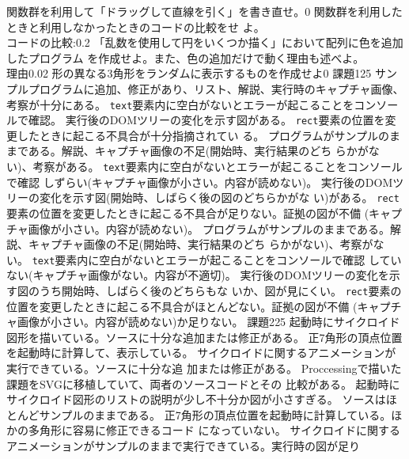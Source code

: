 \documentclass[a4j]{jreport}
\begin{document}
 {
 {\Must 関数群を利用して「ドラッグして直線を引く」を書き直せ。}{0}
 {\Must 関数群を利用したときと利用しなかったときのコードの比較をせ
 よ。\\コードの比較:}{0.2}
 {「乱数を使用して円をいくつか描く」において配列に色を追加したプログラム
 を作成せよ。また、色の追加だけで動く理由も述べよ。\\理由}{0.02}
 {形の異なる3角形をランダムに表示するものを作成せよ}{0}
 }
{}
{{課題1}{25}
{
  {サンプルプログラムに追加、修正があり、リスト、解説、実行時のキャプチャ画像、考察が十分にある。
  \ResultA}
  {\texttt{text}要素内に空白がないとエラーが起こることをコンソールで確認。
  \ResultFI}
  {実行後のDOMツリーの変化を示す図がある。\ResultFI}
  {\texttt{rect}要素の位置を変更したときに起こる不具合が十分指摘されてい
	る。\ResultFI}
}
{
  {プログラムがサンプルのままである。解説、キャプチャ画像の不足(開始時、実行結果のどち
	らかがない)、考察がある。\ResultA}
  {\texttt{text}要素内に空白がないとエラーが起こることをコンソールで確認
	しずらい(キャプチャ画像が小さい。内容が読めない)。\ResultFI}
  {実行後のDOMツリーの変化を示す図(開始時、しばらく後の図のどちらかがな
	い)がある。\ResultFI}
  {\texttt{rect}要素の位置を変更したときに起こる不具合が足りない。証拠の図が不備
	(キャプチャ画像が小さい。内容が読めない)。\ResultEFI}
}
{
  {プログラムがサンプルのままである。解説、キャプチャ画像の不足(開始時、実行結果のどち
	らかがない)、考察がない。\ResultA}
  {\texttt{text}要素内に空白がないとエラーが起こることをコンソールで確認
	していない(キャプチャ画像がない。内容が不適切)。\ResultFI}
  {実行後のDOMツリーの変化を示す図のうち開始時、しばらく後のどちらもな
	いか、図が見にくい。\ResultFI}
  {\texttt{rect}要素の位置を変更したときに起こる不具合がほとんどない。証拠の図が不備
	(キャプチャ画像が小さい。内容が読めない)か足りない。\ResultEFI}
}
 {課題2}{25}
 {
  {起動時にサイクロイド図形を描いている。ソースに十分な追加または修正がある。\ResultA}
  {正7角形の頂点位置を起動時に計算して、表示している。\ResultA}
	{サイクロイドに関するアニメーションが実行できている。ソースに十分な追
	加または修正がある。\ResultA}
	{Proccessingで描いた課題をSVGに移植していて、両者のソースコードとその
	比較がある。\ResultA}
 }
 {
  {起動時にサイクロイド図形のリストの説明が少し不十分か図が小さすぎる。
	ソースはほとんどサンプルのままである。\ResultA}
  {正7角形の頂点位置を起動時に計算している。ほかの多角形に容易に修正できるコード
	になっていない。\ResultA}
	{サイクロイドに関するアニメーションがサンプルのままで実行できている。実行時の図が足り
}}}
\end{document}
